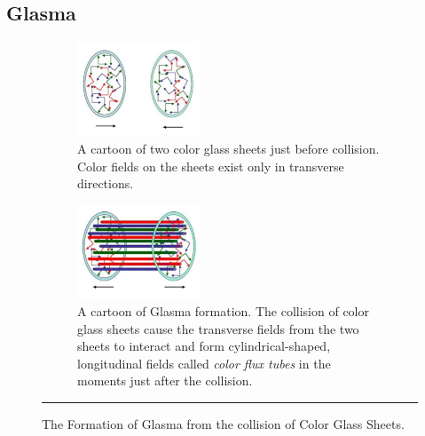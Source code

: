 \subsection{Glasma}
\begin{figure}
\centering
\begin{subfigure}[h!]{0.8\textwidth}
  \centering
    \includegraphics[width=0.4\textwidth]{Figures/collidingCGCsheets.jpg}
  \caption[A cartoon of two color glass sheets just before collision.]{A cartoon of two color glass sheets just before collision. Color fields on the sheets exist only in transverse directions.\citep{McLerran:2008es}} \label{fig:cgcsheets}
\end{subfigure}

\begin{subfigure}[h!]{0.8\textwidth}
  \centering
    \includegraphics[width=0.4\textwidth]{Figures/glasmatubes.jpg}
  \caption[A cartoon of Glasma formation just after color glass collision.]{A cartoon of Glasma formation. The collision of color glass sheets cause the transverse fields from the two sheets to interact and form cylindrical-shaped, longitudinal fields called \textit{color flux tubes} in the moments just after the collision.\citep{McLerran:2008es}}
 \label{fig:glasmatubes}
\end{subfigure}
\label{fig:glasmacartoons} \caption{The Formation of Glasma from the collision of Color Glass Sheets.}    \rule{35em}{0.5pt}
\end{figure}

